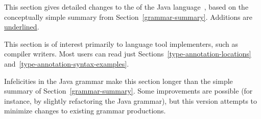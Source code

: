 \documentclass[10pt]{article}
\begin{document}
This section
gives detailed changes to the  of the Java
language~\cite[ch.~18]{GoslingJSB2005}, based on the conceptually
simple summary from
Section~\ref{grammar-summary}.    Additions are
\underline{underlined}.

This section is of interest primarily to language tool implementers, such
as compiler writers.  Most users can read just
Sections~\ref{type-annotation-locations} and~\ref{type-annotation-syntax-examples}.

Infelicities in the Java grammar make this section longer than the simple
summary of Section~\ref{grammar-summary}.  Some improvements are
possible (for instance, by slightly refactoring the Java grammar), but this
version attempts to minimize changes to existing grammar productions.
\end{document}
